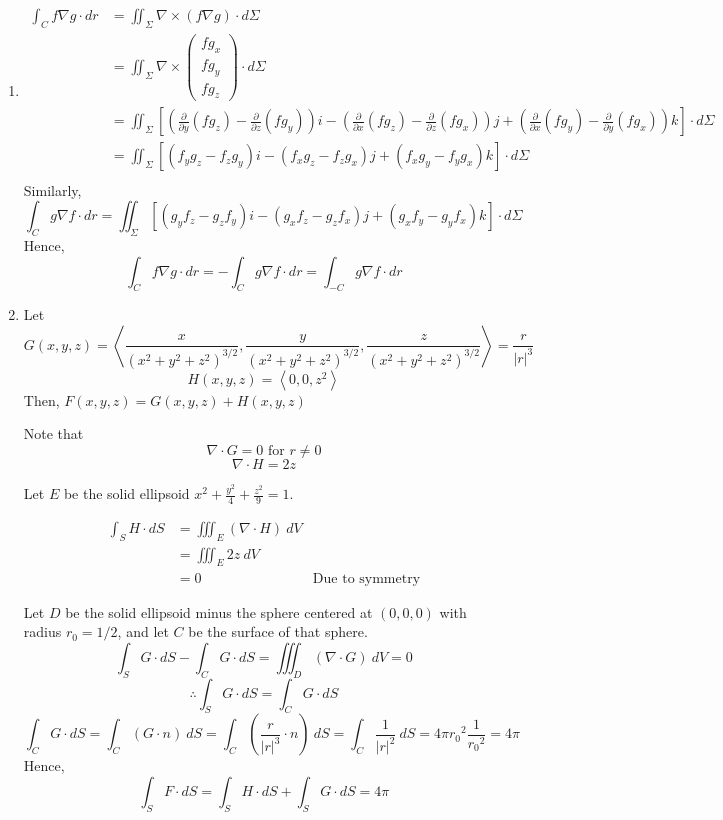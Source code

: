 \documentclass{article}
\newcommand{\p}[2]{\frac{\partial #1}{\partial #2}}
\newcommand{\paren}[1]{\left(#1\right)}
\newcommand{\brac}[1]{\left[#1\right]}
\newcommand{\angbrac}[1]{\left\langle #1 \right\rangle}
\begin{document}
\begin{enumerate}[label=(\alph*)]
\item
\begin{align*}
\int_C f\nabla g\cdot dr &= \iint_\Sigma \nabla \times (f\nabla g)\cdot d\Sigma \\
&= \iint_\Sigma \nabla \times \begin{pmatrix}
fg_x\\fg_y\\fg_z
\end{pmatrix}
\cdot d\Sigma \\
&= \iint_\Sigma \brac{\paren{\p{}{y}(fg_z)-\p{}{z}(fg_y)}i - \paren{\p{}{x}(fg_z)-\p{}{z}(fg_x)}j + \paren{\p{}{x}(fg_y)-\p{}{y}(fg_x)}k }\cdot d\Sigma \\
&= \iint_\Sigma \brac{\paren{f_yg_z-f_zg_y}i - \paren{f_xg_z-f_zg_x}j + \paren{f_xg_y-f_yg_x}k }\cdot d\Sigma \\
\end{align*}
Similarly,
\[
\int_C g\nabla f\cdot dr = \iint_\Sigma \brac{\paren{g_yf_z-g_zf_y}i - \paren{g_xf_z-g_zf_x}j + \paren{g_xf_y-g_yf_x}k }\cdot d\Sigma
\]
Hence,
\[
\int_C f\nabla g\cdot dr = -\int_C g\nabla f\cdot dr = \int_{-C} g\nabla f\cdot dr
\]

\item

Let
\[G(x,y,z) = \angbrac{\frac{x}{(x^2+y^2+z^2)^{3/2}},\frac{y}{(x^2+y^2+z^2)^{3/2}},\frac{z}{(x^2+y^2+z^2)^{3/2}}} = \frac{r}{|r|^3}\]
\[H(x,y,z) = \angbrac{0,0,z^2}\]
Then, $F(x,y,z) = G(x,y,z) + H(x,y,z)$

Note that
\[\nabla \cdot G = 0 \text{ for } r\neq 0\]
\[\nabla \cdot H = 2z\]

Let $E$ be the solid ellipsoid $x^2+\frac{y^2}{4}+\frac{z^2}{9}=1$.

\begin{align*}
\int_S H\cdot dS
&= \iiint_E (\nabla\cdot H)\ dV \\
&= \iiint_E 2z\ dV \\
&= 0 & \text{Due to symmetry}
\end{align*}

Let $D$ be the solid ellipsoid minus the sphere centered at $(0,0,0)$ with radius $r_0 = 1/2$, and let $C$ be the surface of that sphere.
\[
\int_S G\cdot dS - \int_C G\cdot dS = \iiint_D(\nabla\cdot G)\ dV = 0
\]
\[\therefore \int_S G\cdot dS = \int_C G\cdot dS\]
\[
\int_C G\cdot dS = \int_C (G\cdot n)\ dS = \int_C \paren{\frac{r}{|r|^3}\cdot n}\ dS = \int_C \frac{1}{|r|^2}\ dS = 4\pi{r_0}^2 \frac{1}{{r_0}^2} = 4\pi
\]
Hence,
\[
\int_S F\cdot dS = \int_S H\cdot dS + \int_S G\cdot dS = 4\pi
\]

\end{enumerate}
\end{document}
